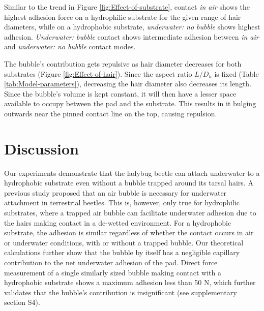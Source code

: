 \documentclass[vruler,JEB]{COB}%
\begin{document}
Similar to the trend in Figure \ref{fig:Effect-of-substrate}, contact
\emph{in air} shows the highest adhesion force on a hydrophilic substrate
for the given range of hair diameters, while on a hydrophobic substrate,
\emph{underwater: no bubble} shows highest adhesion. \emph{Underwater:
bubble} contact shows intermediate adhesion between \emph{in air}
and \emph{underwater: no bubble} contact modes.

The bubble's contribution gets repulsive as hair diameter decreases
for both substrates (Figure \ref{fig:Effect-of-hair}). Since the
aspect ratio $L/D_{h}$ is fixed (Table \ref{tab:Model-parameters}),
decreasing the hair diameter also decreases its length. Since the
bubble's volume is kept constant, it will then have a lesser space
available to occupy between the pad and the substrate. This results
in it bulging outwards near the pinned contact line on the top, causing
repulsion.

\section{Discussion}

Our experiments demonstrate that the ladybug beetle can attach underwater
to a hydrophobic substrate even without a bubble trapped around its
tarsal hairs. A previous study\citep{RN87} proposed that an air bubble
is necessary for underwater attachment in terrestrial beetles. This is, however,
only true for hydrophilic substrates, where a trapped air bubble can facilitate
underwater adhesion due to the hairs making contact in a de-wetted
environment. For a hydrophobic substrate, the adhesion is similar
regardless of whether the contact occurs in air or underwater conditions,
with or without a trapped bubble. Our theoretical calculations further
show that the bubble by itself has a negligible capillary contribution
to the net underwater adhesion of the pad. Direct force measurement
of a single similarly sized bubble making contact with a hydrophobic
substrate shows a maximum adhesion less than 50 \textmu N, which
further validates that the bubble's contribution is insignificant
(see supplementary section S4).
\end{document}
